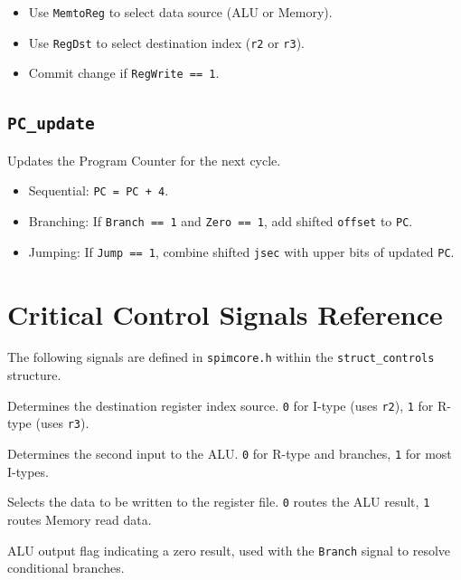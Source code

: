 \begin{itemize}
    \item Use \texttt{MemtoReg} to select data source (ALU or Memory).
    \item Use \texttt{RegDst} to select destination index (\texttt{r2} or \texttt{r3}).
    \item Commit change if \texttt{RegWrite == 1}.
\end{itemize}

\subsection{\texttt{PC\_update}}
Updates the Program Counter for the next cycle.

\begin{itemize}
    \item Sequential: \texttt{PC = PC + 4}.
    \item Branching: If \texttt{Branch == 1} and \texttt{Zero == 1}, add shifted \texttt{offset} to \texttt{PC}.
    \item Jumping: If \texttt{Jump == 1}, combine shifted \texttt{jsec} with upper bits of updated \texttt{PC}.
\end{itemize}

\section{Critical Control Signals Reference}

The following signals are defined in \texttt{spimcore.h} within the \texttt{struct\_controls} structure.

\begin{vocabulary}[RegDst]
Determines the destination register index source. \texttt{0} for I-type (uses \texttt{r2}), \texttt{1} for R-type (uses \texttt{r3}).
\end{vocabulary}

\begin{vocabulary}[ALUSrc]
Determines the second input to the ALU. \texttt{0} for R-type and branches, \texttt{1} for most I-types.
\end{vocabulary}

\begin{vocabulary}[MemtoReg]
Selects the data to be written to the register file. \texttt{0} routes the ALU result, \texttt{1} routes Memory read data.
\end{vocabulary}

\begin{vocabulary}[Zero]
ALU output flag indicating a zero result, used with the \texttt{Branch} signal to resolve conditional branches.
\end{vocabulary}
